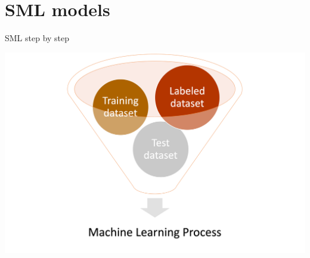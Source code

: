 \documentclass[handout]{beamer}
\begin{document}
	
	\section{SML models}
	
	\begin{frame}{SML step by step}
		
		\begin{center}
			\includegraphics[width=\linewidth,height=\textheight,keepaspectratio]{../pictures/MLingredients.png} \\\
		\end{center}
		
		
		
	\end{frame}
	
\end{document}
